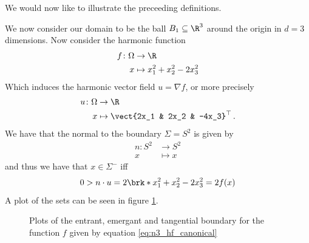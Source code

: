 We would now like to illustrate the preceeding definitions.
\begin{example}\label{ex:n3_hvf_canonical}
  We now consider our domain to be the ball $B_1\subseteq\R^3$ around the origin in $d=3$ dimensions.
  Now consider the harmonic function
  \begin{equation}
    \begin{aligned}
    f\colon \Omega&\to\R \\
    x&\mapsto x_1^2+x_2^2-2x_3^2\label{eq:n3_hf_canonical}
    \end{aligned}
  \end{equation}
  Which induces the harmonic vector field $u=\nabla f$, or more precisely
  \begin{equation}
    \begin{aligned}
    u\colon \Omega&\to\R \\
    x&\mapsto \vect{2x_1 & 2x_2 & -4x_3}^\top\,.\label{eq:n3_hvf_canonical}
    \end{aligned}
  \end{equation}
  We have that the normal to the boundary $\Sigma=S^2$ is given by
  \begin{align*}
    n\colon S^2&\to S^2 \\
    x&\mapsto x
  \end{align*}
  and thus we have that $x\in\Sigma^-$ iff 
  \begin{align*}
    0>n\cdot u = 2\brk*{x_1^2+x_2^2-2x_3^2}=2f(x)
  \end{align*}
  A plot of the sets can be seen in figure \ref{pl:n3_hvf_canonical_boundary}.
  \begin{figure}
    \centering
    \missingfigure[figwidth=0.7\textwidth]{}
    \caption{Plots of the entrant, emergant and tangential boundary for the
      function $f$ given by equation \eqref{eq:n3_hf_canonical}}
    \label{pl:n3_hvf_canonical_boundary}
  \end{figure}
\end{example}

